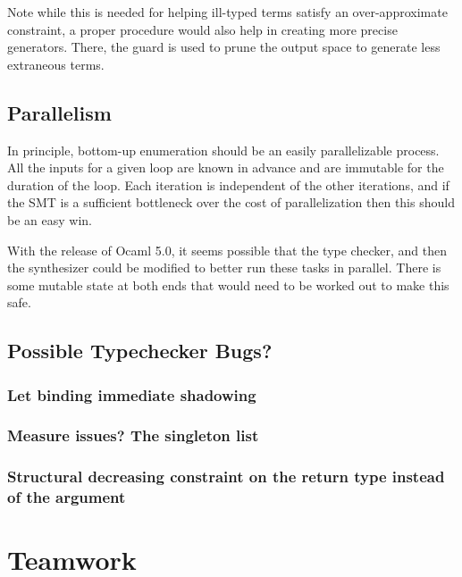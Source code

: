 \documentclass[review, sigplan]{acmart}
\begin{document}
Note while this is needed for helping ill-typed terms satisfy an
over-approximate constraint, a proper procedure would also help in creating more
precise generators. There, the guard is used to prune the output space to
generate less extraneous terms.

\subsection{Parallelism}
In principle, bottom-up enumeration should be an easily parallelizable process.
All the inputs for a given loop are known in advance and are immutable for the
duration of the loop. Each iteration is independent of the other iterations, and
if the SMT is a sufficient bottleneck over the cost of parallelization then
this should be an easy win.

With the release of Ocaml 5.0, it seems possible that the type checker, and then
the synthesizer could be modified to better run these tasks in parallel. There
is some mutable state at both ends that would need to be worked out to make this safe.

\subsection{Possible Typechecker Bugs?}


\subsubsection{Let binding immediate shadowing}

\subsubsection{Measure issues? The singleton list}

\subsubsection{Structural decreasing constraint on the return type instead of the argument}


\section{Teamwork}
\end{document}

